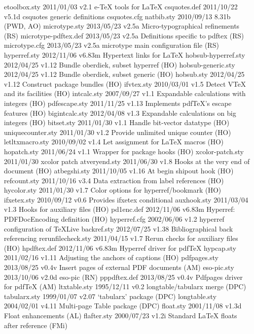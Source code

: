 etoolbox.sty    2011/01/03 v2.1 e-TeX tools for LaTeX
csquotes.def    2011/10/22 v5.1d csquotes generic definitions
csquotes.cfg    
  natbib.sty    2010/09/13 8.31b (PWD, AO)
microtype.sty    2013/05/23 v2.5a Micro-typographical refinements (RS)
microtype-pdftex.def    2013/05/23 v2.5a Definitions specific to pdftex (RS)
microtype.cfg    2013/05/23 v2.5a microtype main configuration file (RS)
hyperref.sty    2012/11/06 v6.83m Hypertext links for LaTeX
hobsub-hyperref.sty    2012/04/25 v1.12 Bundle oberdiek, subset hyperref (HO)
hobsub-generic.sty    2012/04/25 v1.12 Bundle oberdiek, subset generic (HO)
  hobsub.sty    2012/04/25 v1.12 Construct package bundles (HO)
  ifvtex.sty    2010/03/01 v1.5 Detect VTeX and its facilities (HO)
 intcalc.sty    2007/09/27 v1.1 Expandable calculations with integers (HO)
pdfescape.sty    2011/11/25 v1.13 Implements pdfTeX's escape features (HO)
bigintcalc.sty    2012/04/08 v1.3 Expandable calculations on big integers (HO)
  bitset.sty    2011/01/30 v1.1 Handle bit-vector datatype (HO)
uniquecounter.sty    2011/01/30 v1.2 Provide unlimited unique counter (HO)
letltxmacro.sty    2010/09/02 v1.4 Let assignment for LaTeX macros (HO)
 hopatch.sty    2011/06/24 v1.1 Wrapper for package hooks (HO)
xcolor-patch.sty    2011/01/30 xcolor patch
atveryend.sty    2011/06/30 v1.8 Hooks at the very end of document (HO)
atbegshi.sty    2011/10/05 v1.16 At begin shipout hook (HO)
refcount.sty    2011/10/16 v3.4 Data extraction from label references (HO)
 hycolor.sty    2011/01/30 v1.7 Color options for hyperref/bookmark (HO)
 ifxetex.sty    2010/09/12 v0.6 Provides ifxetex conditional
 auxhook.sty    2011/03/04 v1.3 Hooks for auxiliary files (HO)
  pd1enc.def    2012/11/06 v6.83m Hyperref: PDFDocEncoding definition (HO)
hyperref.cfg    2002/06/06 v1.2 hyperref configuration of TeXLive
 backref.sty    2012/07/25 v1.38 Bibliographical back referencing
rerunfilecheck.sty    2011/04/15 v1.7 Rerun checks for auxiliary files (HO)
 hpdftex.def    2012/11/06 v6.83m Hyperref driver for pdfTeX
  hypcap.sty    2011/02/16 v1.11 Adjusting the anchors of captions (HO)
pdfpages.sty    2013/08/25 v0.4v Insert pages of external PDF documents (AM)
 eso-pic.sty    2013/10/06 v2.0d eso-pic (RN)
pppdftex.def    2013/08/25 v0.4v Pdfpages driver for pdfTeX (AM)
ltxtable.sty    1995/12/11 v0.2 longtable/tabularx merge (DPC)
tabularx.sty    1999/01/07 v2.07 `tabularx' package (DPC)
longtable.sty    2004/02/01 v4.11 Multi-page Table package (DPC)
   float.sty    2001/11/08 v1.3d Float enhancements (AL)
 flafter.sty    2000/07/23 v1.2i Standard LaTeX floats after reference (FMi)
